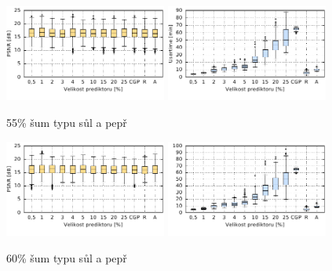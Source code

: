 \begin{figure}[H]
    \centering
    \includegraphics[width=0.475\textwidth]{fig/plot/compare/saltpepper55-100kg-psnrtest.pdf}
    \hskip0.5cm
    \includegraphics[width=0.475\textwidth]{fig/plot/compare/saltpepper55-100kg-usertime.pdf}
    \caption{55\% šum typu sůl a pepř}
\end{figure}

\begin{figure}[H]
    \centering
    \includegraphics[width=0.475\textwidth]{fig/plot/compare/saltpepper60-100kg-psnrtest.pdf}
    \hskip0.5cm
    \includegraphics[width=0.475\textwidth]{fig/plot/compare/saltpepper60-100kg-usertime.pdf}
    \caption{60\% šum typu sůl a pepř}
\end{figure}

